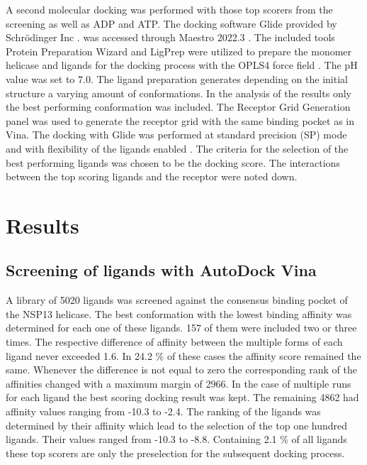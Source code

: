 \documentclass[11pt, letterpaper, titlepage]{article}
\renewcommand{\cite}{\parencite}
\begin{document}
A second molecular docking was performed with those top scorers from the screening as well as ADP and ATP. The docking software Glide provided by Schrödinger Inc \cite{Friesner2004}. was accessed through Maestro 2022.3 \cite{Maestro2022}. The included tools Protein Preparation Wizard and LigPrep \cite{Madhavi2013} were utilized to prepare the monomer helicase and ligands for the docking process with the OPLS4 force field \cite{Lu2021}. The pH value was set to 7.0. The ligand preparation generates depending on the initial structure a varying amount of conformations. In the analysis of the results only the best performing conformation was included. The Receptor Grid Generation panel was used to generate the receptor grid with the same binding pocket as in \ac{Vina}. The docking with Glide was performed at standard precision (SP) mode and with flexibility of the ligands enabled \cite{Halgren.2004}. The criteria for the selection of the best performing ligands was chosen to be the docking score. The interactions between the top scoring ligands and the receptor were noted down. 


\section{Results}

\subsection{Screening of ligands with AutoDock Vina}
A library of 5020 ligands was screened against the consensus binding pocket of the NSP13 helicase. The best conformation with the lowest binding affinity was determined for each one of these ligands. 157 of them were included two or three times. The respective difference of affinity between the multiple forms of each ligand never exceeded 1.6. In 24.2 \% of these cases the affinity score remained the same. Whenever the difference is not equal to zero the corresponding rank of the affinities changed with a maximum margin of 2966. In the case of multiple runs for each ligand the best scoring docking result was kept. The remaining 4862 had affinity values ranging from -10.3 to -2.4. The ranking of the ligands was determined by their affinity which lead to the selection of the top one hundred ligands. Their values ranged from -10.3 to -8.8. Containing 2.1 \% of all ligands these top scorers are only the preselection for the subsequent docking process. 
\end{document}
